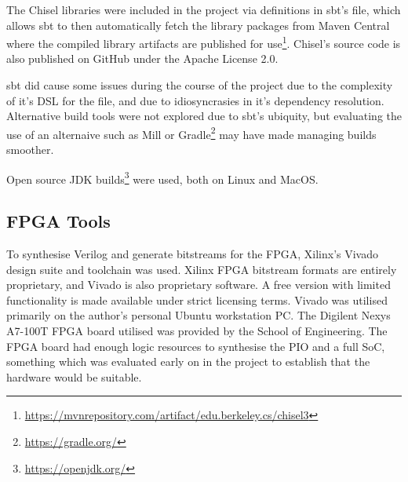 The Chisel libraries were included in the project via definitions in sbt's  file, which allows sbt to then automatically fetch the library packages from Maven Central where the compiled library artifacts are published for use\footnote{\url{https://mvnrepository.com/artifact/edu.berkeley.cs/chisel3}}. Chisel's source code is also published on GitHub under the Apache License 2.0.

sbt did cause some issues during the course of the project due to the complexity of it's DSL for the  file, and due to idiosyncrasies in it's dependency resolution. Alternative build tools were not explored due to sbt's ubiquity, but evaluating the use of an alternaive such as Mill \cite{Mill} or Gradle\footnote{\url{https://gradle.org/}} may have made managing builds smoother.

Open source JDK builds\footnote{\url{https://openjdk.org/}} were used, both on Linux and MacOS.

\subsection{FPGA Tools}

To synthesise Verilog and generate bitstreams for the FPGA, Xilinx's Vivado design suite and toolchain was used. Xilinx FPGA bitstream formats are entirely proprietary, and Vivado is also proprietary software. A free version with limited functionality is made available under strict licensing terms. Vivado was utilised primarily on the author's personal Ubuntu workstation PC. The Digilent Nexys A7-100T FPGA board utilised was provided by the School of Engineering. The FPGA board had enough logic resources to synthesise the PIO and a full SoC, something which was evaluated early on in the project to establish that the hardware would be suitable.

